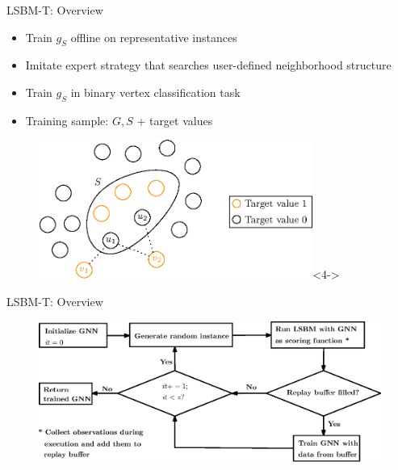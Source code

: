 \documentclass{beamer}
\begin{document}
\begin{frame}{LSBM-T: Overview}
    \begin{itemize}
        \item<1-> Train $g_S$ offline on representative instances
        \item<2-> Imitate expert strategy that searches user-defined neighborhood structure
        \item<3-> Train $g_S$ in binary vertex classification task
        \item<4-> Training sample: $G, S$ + target values
    \end{itemize}
    \begin{figure}
        \centering
        \includegraphics[width=0.8\textwidth]{graphics/target_values.eps}<4->
    \end{figure}
\end{frame}

\begin{frame}{LSBM-T: Overview}
    \begin{figure}
        \centering
        \includegraphics[width=\textwidth]{graphics/flowchart.eps}
    \end{figure}
\end{frame}
\end{document}
